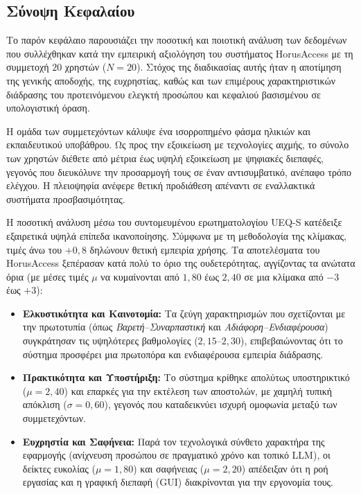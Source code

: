\documentclass[twoside, a4paper, 11pt]{article}
\newcommand{\textlatin}[1]{\textenglish{#1}}
\begin{document}
\subsection{Σύνοψη Κεφαλαίου}

Το παρόν κεφάλαιο παρουσιάζει την ποσοτική και ποιοτική ανάλυση των δεδομένων που συλλέχθηκαν κατά την εμπειρική αξιολόγηση του συστήματος \textlatin{HorusAccess} με τη συμμετοχή $20$ χρηστών ($N = 20$). Στόχος της διαδικασίας αυτής ήταν η αποτίμηση της γενικής αποδοχής, της ευχρηστίας, καθώς και των επιμέρους χαρακτηριστικών διάδρασης του προτεινόμενου ελεγκτή προσώπου και κεφαλιού βασισμένου σε υπολογιστική όραση.

Η ομάδα των συμμετεχόντων κάλυψε ένα ισορροπημένο φάσμα ηλικιών και εκπαιδευτικού υποβάθρου. Ως προς την εξοικείωση με τεχνολογίες αιχμής, το σύνολο των χρηστών διέθετε από μέτρια έως υψηλή εξοικείωση με ψηφιακές διεπαφές, γεγονός που διευκόλυνε την προσαρμογή τους σε έναν αντισυμβατικό, ανέπαφο τρόπο ελέγχου. Η πλειοψηφία ανέφερε θετική προδιάθεση απέναντι σε εναλλακτικά συστήματα προσβασιμότητας.

Η ποσοτική ανάλυση μέσω του συντομευμένου ερωτηματολογίου \textlatin{UEQ-S} κατέδειξε εξαιρετικά υψηλά επίπεδα ικανοποίησης. Σύμφωνα με τη μεθοδολογία της κλίμακας, τιμές άνω του $+0,8$ δηλώνουν θετική εμπειρία χρήσης. Τα αποτελέσματα του \textlatin{HorusAccess} ξεπέρασαν κατά πολύ το όριο της ουδετερότητας, αγγίζοντας τα ανώτατα όρια (με μέσες τιμές $\mu$ να κυμαίνονται από $1,80$ έως $2,40$ σε μια κλίμακα από $-3$ έως $+3$):

\begin{itemize}
    \item \textbf{Ελκυστικότητα και Καινοτομία:} Τα ζεύγη χαρακτηρισμών που σχετίζονται με την πρωτοτυπία (όπως \textit{Βαρετή–Συναρπαστική} και \textit{Αδιάφορη–Ενδιαφέρουσα}) συγκράτησαν τις υψηλότερες βαθμολογίες ($2{,}15\text{--}2{,}30$), επιβεβαιώνοντας ότι το σύστημα προσφέρει μια πρωτοπόρα και ενδιαφέρουσα εμπειρία διάδρασης.
    
    \item \textbf{Πρακτικότητα και Υποστήριξη:} Το σύστημα κρίθηκε απολύτως υποστηρικτικό ($\mu = 2,40$) και επαρκές για την εκτέλεση των αποστολών, με χαμηλή τυπική απόκλιση ($\sigma = 0,60$), γεγονός που καταδεικνύει ισχυρή ομοφωνία μεταξύ των συμμετεχόντων.
    
    \item \textbf{Ευχρηστία και Σαφήνεια:} Παρά τον τεχνολογικά σύνθετο χαρακτήρα της εφαρμογής (ανίχνευση προσώπου σε πραγματικό χρόνο και τοπικό \textlatin{LLM}), οι δείκτες ευκολίας ($\mu = 1,80$) και σαφήνειας ($\mu = 2,20$) απέδειξαν ότι η ροή εργασίας και η γραφική διεπαφή (\textlatin{GUI}) διακρίνονται για την εργονομία τους.
\end{itemize}
\end{document}
